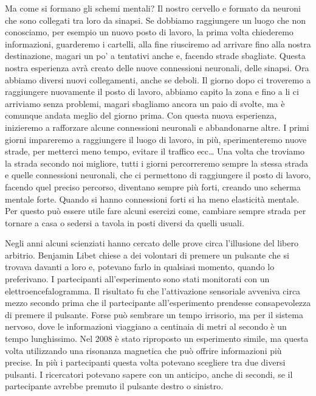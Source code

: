 \documentclass[12pt]{book} %
\begin{document}
Ma come si formano gli schemi mentali? Il nostro cervello e formato da neuroni che sono collegati tra loro da sinapsi. Se dobbiamo
raggiungere un luogo che non conosciamo, per esempio un nuovo posto di lavoro, la prima volta chiederemo informazioni,
guarderemo i cartelli, alla fine riusciremo ad arrivare fino alla nostra destinazione, magari un po' a tentativi anche
e, facendo strade sbagliate. Questa nostra esperienza avrà creato delle nuove connessioni neuronali, delle sinapsi. Ora
abbiamo diversi nuovi collegamenti, anche se deboli. Il giorno dopo ci troveremo a raggiungere nuovamente il posto di
lavoro, abbiamo capito la zona e fino a li ci arriviamo senza problemi, magari sbagliamo ancora un paio di svolte, ma è
comunque andata meglio del giorno prima. Con questa nuova esperienza, inizieremo a rafforzare alcune connessioni
neuronali e abbandonarne altre. I primi giorni impareremo a raggiungere il luogo di lavoro, in più, sperimenteremo
nuove strade, per metterci meno tempo, evitare il traffico ecc… Una volta che troviamo la strada secondo noi migliore,
tutti i giorni percorreremo sempre la stessa strada e quelle connessioni neuronali, che ci permettono di raggiungere il
posto di lavoro, facendo quel preciso percorso, diventano sempre più forti, creando uno scherma mentale forte. Quando
si hanno connessioni forti si ha meno elasticità mentale. Per questo può essere utile fare alcuni esercizi come,
cambiare sempre strada per tornare a casa o sedersi a tavola in posti diversi da quelli usuali.

Negli anni alcuni scienziati hanno cercato delle prove circa l'illusione del libero arbitrio.
Benjamin Libet chiese a dei volontari di premere un pulsante che si trovava davanti a loro e, potevano farlo in
qualsiasi momento, quando lo preferivano. I partecipanti all'esperimento sono stati monitorati con
un elettroencefalogramma. Il risultato fu che l'attivazione sensoriale avveniva circa mezzo
secondo prima che il partecipante all'esperimento prendesse consapevolezza di premere il pulsante.
Forse può sembrare un tempo irrisorio, ma per il sistema nervoso, dove le informazioni viaggiano a centinaia di metri
al secondo è un tempo lunghissimo. Nel 2008 è stato riproposto un esperimento simile, ma questa volta utilizzando una risonanza magnetica che può offrire informazioni più precise. In più i
partecipanti questa volta potevano scegliere tra due diversi pulsanti. I ricercatori potevano sapere con un anticipo,
anche di secondi, se il partecipante avrebbe premuto il pulsante destro o sinistro.
\end{document}
